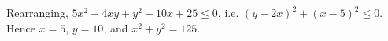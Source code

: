 Rearranging, $5x^2-4xy+y^2-10x+25\le0$, i.e. $(y-2x)^2+(x-5)^2\le0$. Hence $x=5$, $y=10$, and $x^2+y^2=\boxed{125}$.
